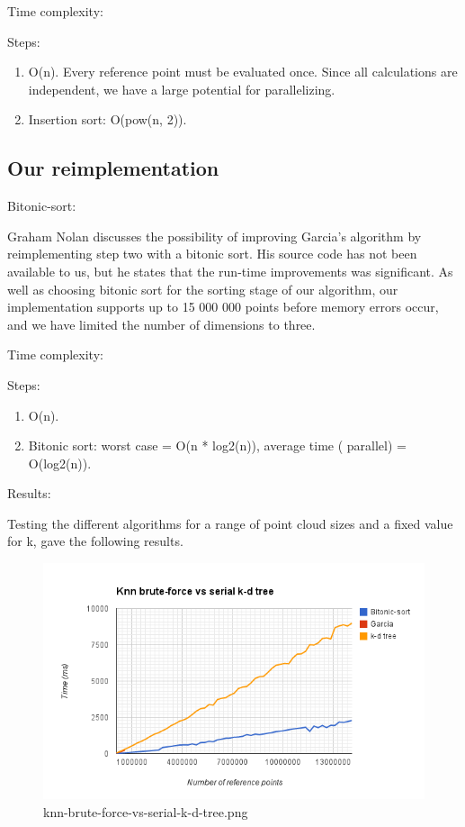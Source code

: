 Time complexity:

Steps:

\begin{enumerate}
    \item O(n). Every reference point must be evaluated once. Since all calculations are independent, we have a large potential for parallelizing.
    \item Insertion sort: O(pow(n, 2)).
\end{enumerate}

\subsection{Our reimplementation} %
\label{ssub:our_reimplementation_2}

Bitonic-sort:

Graham Nolan discusses the possibility of improving Garcia's algorithm by reimplementing step two with a bitonic sort. His source code has not been available to us, but he states that the run-time improvements was significant. As well as choosing bitonic sort for the sorting stage of our algorithm, our implementation supports up to 15 000 000 points before memory errors occur, and we have limited the number of dimensions to three.

Time complexity:

Steps:
\begin{enumerate}
    \item O(n).
    \item Bitonic sort: worst case = O(n * log2(n)), average time ( parallel) = O(log2(n)).
\end{enumerate}

Results:

Testing the different algorithms for a range of point cloud sizes and a fixed value for k, gave the following results.

\begin{figure}[ht!]
\centering
\includegraphics[width=120mm]{../gfx/knn-brute-force-vs-serial-k-d-tree.png}

\caption{knn-brute-force-vs-serial-k-d-tree.png}
\label{fig:knn_brute_force_vs_serial_k_d_tree}
\end{figure}

